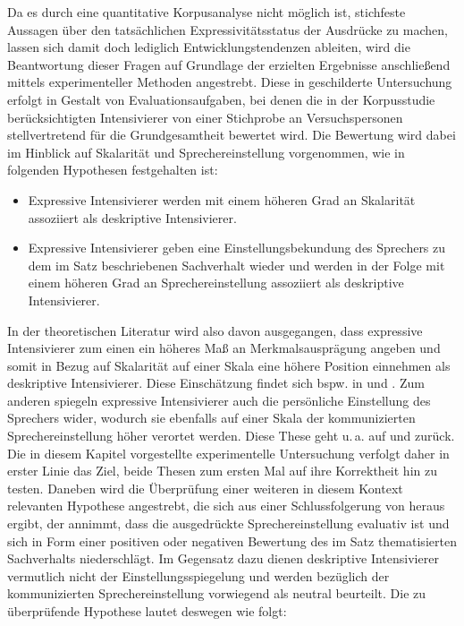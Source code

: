 Da es durch eine quantitative Korpusanalyse nicht möglich ist, stichfeste Aussagen über den tatsächlichen Expressivitätsstatus der Ausdrücke zu machen, lassen sich damit doch lediglich Entwicklungstendenzen ableiten, wird die Beantwortung dieser Fragen auf Grundlage der erzielten Ergebnisse anschließend mittels experimenteller Methoden angestrebt. Diese in {} geschilderte Untersuchung erfolgt in Gestalt von Evaluationsaufgaben, bei denen die in der Korpusstudie berücksichtigten Intensivierer von einer Stichprobe an Versuchspersonen stellvertretend für die Grundgesamtheit bewertet wird. Die Bewertung wird dabei im Hinblick auf Skalarität und Sprechereinstellung vorgenommen, wie in folgenden Hypothesen {festgehalten ist}:

\begin{itemize}
\item[\textbf{\textsc{H3}}] Expressive Intensivierer werden mit einem höheren Grad an Skalarität
assoziiert als deskriptive Intensivierer. 

\item[\textbf{\textsc{H4}}] Expressive Intensivierer geben eine Einstellungsbekundung des Sprechers
zu dem im Satz beschriebenen Sachverhalt wieder und werden in der Folge mit einem höheren Grad an Sprechereinstellung assoziiert als deskriptive Intensivierer. 
\end{itemize}

\noindent In der theoretischen Literatur wird also davon ausgegangen, dass expressive Intensivierer zum einen ein höheres Maß an Merkmalsausprägung angeben und somit in Bezug auf Skalarität auf einer Skala eine höhere Position einnehmen als deskriptive Intensivierer. Diese Einschätzung findet sich bspw. in {\citet[]{Paradis.1997}} und \citet[]{Gutzmann.2019a}. Zum anderen spiegeln expressive Intensivierer auch die persönliche Einstellung des Sprechers wider, wodurch sie ebenfalls auf einer Skala der kommunizierten Sprechereinstellung höher verortet werden. Diese These geht u.\,a. auf \citet[]{Lang.1983} und {\citet[]{Ortner.2014}} zurück. Die in diesem Kapitel vorgestellte experimentelle Untersuchung verfolgt daher in erster Linie das Ziel, beide Thesen zum ersten Mal auf ihre Korrektheit hin zu testen. Daneben wird die Überprüfung einer weiteren in diesem Kontext relevanten Hypothese angestrebt, die sich aus einer Schlussfolgerung von \citet[]{Gutzmann.2019a} heraus ergibt, der annimmt, dass die ausgedrückte Sprechereinstellung evaluativ ist und sich in Form einer positiven oder negativen Bewertung des im Satz thematisierten Sachverhalts niederschlägt. Im Gegensatz dazu dienen deskriptive Intensivierer vermutlich nicht der Einstellungsspiegelung und werden bezüglich der kommunizierten Sprechereinstellung vorwiegend als neutral beurteilt. Die zu überprüfende Hypothese lautet deswegen wie folgt:

